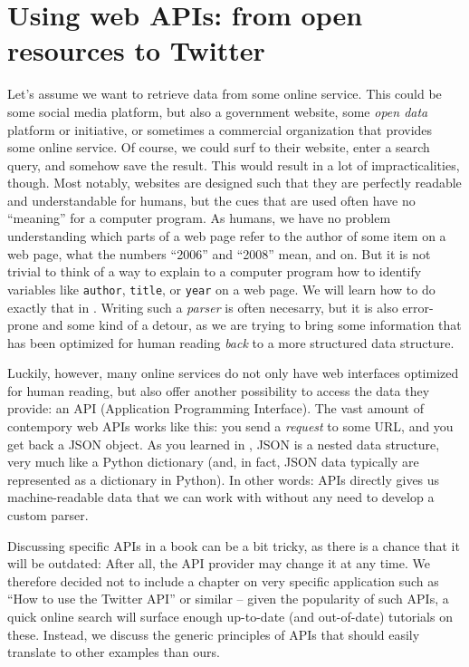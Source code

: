 \section{Using web APIs: from open resources to Twitter}
\label{sec:apis}

Let's assume we want to retrieve data from some online service. This
could be some social media platform, but also a government website,
some \emph{open data} platform or initiative, or sometimes a
commercial organization that provides some online service.  Of course,
we could surf to their website, enter a search query, and somehow save
the result. This would result in a lot of impracticalities,
though. Most notably, websites are designed such that they are
perfectly readable and understandable for humans, but the cues that
are used often have no ``meaning'' for a computer program. As humans,
we have no problem understanding which parts of a web page refer to
the author of some item on a web page, what the numbers ``2006'' and
``2008'' mean, and on. But it is not trivial to think of a way to
explain to a computer program how to identify variables like
\texttt{author}, \texttt{title}, or \texttt{year} on a web page.
We will learn how to do exactly that in . Writing
such a \emph{parser} is often necesarry, but it is also error-prone
and some kind of a detour, as we are trying to bring some information
that has been optimized for human reading \emph{back} to a more
structured data structure. 

Luckily, however, many online services do not only have web interfaces
optimized for human reading, but also offer another possibility to
access the data they provide: an API (Application Programming
Interface).
The vast amount of contempory web APIs works like this: you send a
\emph{request} to some URL, and you get back a JSON object. As you
learned in , JSON is a nested data structure, very
much like a Python dictionary (and, in fact, JSON data typically are
represented as a dictionary in Python). In other words: APIs directly
gives us machine-readable data that we can work with without any need
to develop a custom parser.

Discussing specific APIs in a book can be a bit tricky, as there is a
chance that it will be outdated: After all, the API provider may change
it at any time. We therefore decided not to include a chapter on very
specific application such as ``How to use the Twitter API'' or similar --
given the popularity of such APIs, a quick online search will surface
enough up-to-date (and out-of-date) tutorials on these. Instead,
we discuss the generic principles of APIs that should easily translate
to other examples than ours.


